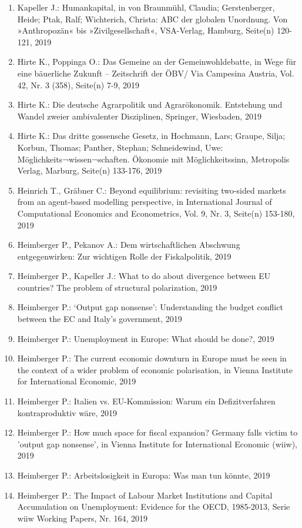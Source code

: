 \begin{enumerate}
	 \item Kapeller J.: Humankapital, in von Braunmühl, Claudia; Gerstenberger, Heide; Ptak, Ralf; Wichterich, Christa: ABC der globalen Unordnung. Von »Anthropozän« bis »Zivilgesellschaft«, VSA-Verlag, Hamburg, Seite(n) 120-121, 2019
	 \item Hirte K., Poppinga O.: Das Gemeine an der Gemeinwohldebatte, in Wege für eine bäuerliche Zukunft – Zeitschrift der ÖBV/ Via Campesina Austria, Vol. 42, Nr. 3 (358), Seite(n) 7-9, 2019
	 \item Hirte K.: Die deutsche Agrarpolitik und Agrarökonomik. Entstehung und Wandel zweier ambivalenter Disziplinen, Springer, Wiesbaden, 2019
	 \item Hirte K.: Das dritte gossensche Gesetz, in Hochmann, Lars; Graupe, Silja; Korbun, Thomas; Panther, Stephan; Schneidewind, Uwe: Möglichkeits¬wissen¬schaften. Ökonomie mit Möglichkeitssinn, Metropolis Verlag, Marburg, Seite(n) 133-176, 2019
	 \item Heinrich T., Gräbner C.: Beyond equilibrium: revisiting two-sided markets from an agent-based modelling perspective, in International Journal of Computational Economics and Econometrics, Vol. 9, Nr. 3, Seite(n) 153-180, 2019
	 \item Heimberger P., Pekanov A.: Dem wirtschaftlichen Abschwung entgegenwirken: Zur wichtigen Rolle der Fiskalpolitik, 2019
	 \item Heimberger P., Kapeller J.: What to do about divergence between EU countries? The problem of structural polarization, 2019
	 \item Heimberger P.: ‘Output gap nonsense': Understanding the budget conflict between the EC and Italy’s government, 2019
	 \item Heimberger P.: Unemployment in Europe: What should be done?, 2019
	 \item Heimberger P.: The current economic downturn in Europe must be seen in the context of a wider problem of economic polarisation, in Vienna Institute for International Economic, 2019
	 \item Heimberger P.: Italien vs. EU-Kommission: Warum ein Defizitverfahren kontraproduktiv wäre, 2019
	 \item Heimberger P.: How much space for fiscal expansion? Germany falls victim to 'output gap nonsense’, in Vienna Institute for International Economic (wiiw), 2019
	 \item Heimberger P.: Arbeitslosigkeit in Europa: Was man tun könnte, 2019
	 \item Heimberger P.: The Impact of Labour Market Institutions and Capital Accumulation on Unemployment: Evidence for the OECD, 1985-2013, Serie wiiw Working Papers, Nr. 164, 2019

\end{enumerate}
